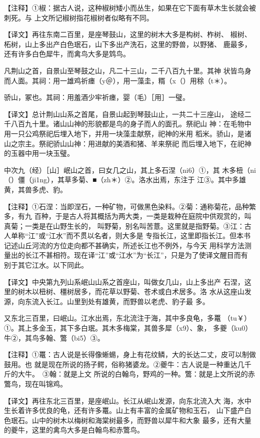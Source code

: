 \documentclass[a4paper,12pt,UTF8,twoside]{ctexbook}
\begin{document}
【注释】①椒：据古人说，这种椒树矮小而丛生，如果在它下面有草木生长就会被刺死。与 上文所记椒树指花椒树者似略有不同。

【译文】再往东南二百里，是座琴鼓山，这里的树木大多是构树、柞树、 椒树、柘树，山上多出产白色珉石，山下多出产洗石，这里的野兽，以野猪、 鹿最多，还有许多白色犀牛，而禽鸟大多是鸩鸟。

凡荆山之首，自景山至琴鼓之山，凡二十三山，二千八百九十里。其神 状皆鸟身而人面。其祠：用一雄鸡祈瘗（y＠），用一藻圭，糈（x（）用稌（t＊）。

骄山，冢也。其祠：用羞酒少牢祈瘗，婴（毛）［用］一璧。

【译文】总计荆山山系之首尾，自景山起到琴鼓山止，一共二十三座山， 途经二千八百九十里。诸山山神的形貌都是鸟的身子而人的面孔。祭祀山 神：在毛物中用一只公鸡祭祀后埋入地下，并用一块藻圭献祭，祀神的米用 稻米。骄山，是诸山之宗主。祭祀骄山山神：用进献的美酒和猪、羊来祭祀 而后埋入地下，在祀神的玉器中用一块玉璧。

中次九（经）［山］岷山之首，曰女几之山，其上多石涅（ni6）①，其 木多杻（ni（）僵（ji1ng），其草多菊、■（zh＊）②。洛水出焉，东注于 江③。其中多雄黄，其兽多虎、豹。

【注释】①石涅：当即涅石，一种矿物，可做黑色染料。②菊：通称菊花，品种繁多，有九 百种，于是古人将其概括为两大类，一类是栽种在庭院中供观赏的，叫真菊；一类是在山野生长的， 叫野菊，别名叫苦薏。这里就是指野菊。③江：古人单称“江”或“江水”而不贯以名者，则大多是 专指长江，这里即指长江。但本书记述山丘河流的方位走向都不甚确实，所述长江也不例外，与今天 用科学方法测量出的长江不甚相符。现在译“江”或“江水”为“长江”，只是为了使译文醒目而有 别于其它江水。以下同此。

【译文】中央第九列山系岷山山系之首座山，叫做女几山，山上多出产 石涅，这里的树木以杻树、橿树居多，而花草以野菊、苍术或白术居多。洛 水从这座山发源，向东流入长江。山里到处有雄黄，而野兽以老虎、豹子最 多。

又东北三百里，曰岷山。江水出焉，东北流注于海，其中多良龟，多鼍 （tu￥）①。其上多金玉，其下多白珉。其木多梅棠，其兽多犀（x9）、象， 多夔（ku0）牛②，其鸟多翰、鷩（bi5）③。

【注释】①鼍：古人说是长得像蜥蜴，身上有花纹鳞，大的长达二丈，皮可以制做鼓用。也 就是现在所说的扬子鳄，俗称猪婆龙。②夔牛：古人说是一种重达几千斤的大牛。　③翰：就是上文 所说的白翰鸟，野鸡的一种。鷩：就是上文所说的赤鷩鸟，现在叫锦鸡。

【译文】再往东北三百里，是座岷山。长江从岷山发源，向东北流入大 海，水中生长着许多优良的龟，还有许多鼍。山上有丰富的金属矿物和玉石， 山下盛产白色珉石。山中的树木以梅树和海棠树最多，而野兽以犀牛和大象 最多，还有大量的夔牛，这里的禽鸟大多是白翰鸟和赤鷩鸟。
\end{document}
